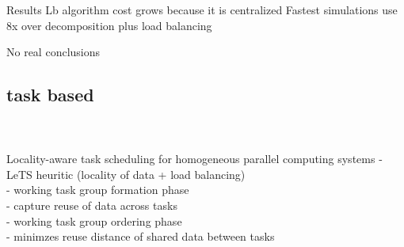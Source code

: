 \documentclass{article}
\begin{document}
Results
Lb algorithm cost grows because it is centralized
Fastest simulations use 8x over decomposition plus load balancing

No real conclusions


\cite{BERLINSKA201814}
\cite{8017633}
\cite{DEVINE2005133}
\cite{javataskpool}
\cite{barat:tel-01672546}



\subsection{task based}

\cite{CPE:CPE1631}\\
\cite{Bhatti2017}\\
Locality-aware task scheduling for homogeneous parallel computing systems
- LeTS heuritic (locality of data + load balancing)\\ 
- working task group formation phase\\
	- capture reuse of data across tasks\\
- working task group ordering phase\\
	- minimzes reuse distance of shared data between tasks\\
\end{document}
